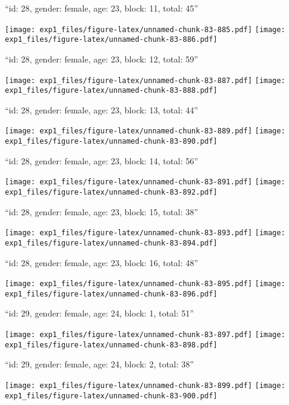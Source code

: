 \documentclass[11pt,,]{article}
\begin{document}
\newpage
[1] 

``id: 28, gender: female, age: 23, block: 11, total: 45''

\texttt{[image: exp1\_files/figure-latex/unnamed-chunk-83-885.pdf]}
\texttt{[image: exp1\_files/figure-latex/unnamed-chunk-83-886.pdf]}

\newpage
[1] 

``id: 28, gender: female, age: 23, block: 12, total: 59''

\texttt{[image: exp1\_files/figure-latex/unnamed-chunk-83-887.pdf]}
\texttt{[image: exp1\_files/figure-latex/unnamed-chunk-83-888.pdf]}

\newpage
[1] 

``id: 28, gender: female, age: 23, block: 13, total: 44''

\texttt{[image: exp1\_files/figure-latex/unnamed-chunk-83-889.pdf]}
\texttt{[image: exp1\_files/figure-latex/unnamed-chunk-83-890.pdf]}

\newpage
[1] 

``id: 28, gender: female, age: 23, block: 14, total: 56''

\texttt{[image: exp1\_files/figure-latex/unnamed-chunk-83-891.pdf]}
\texttt{[image: exp1\_files/figure-latex/unnamed-chunk-83-892.pdf]}

\newpage
[1] 

``id: 28, gender: female, age: 23, block: 15, total: 38''

\texttt{[image: exp1\_files/figure-latex/unnamed-chunk-83-893.pdf]}
\texttt{[image: exp1\_files/figure-latex/unnamed-chunk-83-894.pdf]}

\newpage
[1] 

``id: 28, gender: female, age: 23, block: 16, total: 48''

\texttt{[image: exp1\_files/figure-latex/unnamed-chunk-83-895.pdf]}
\texttt{[image: exp1\_files/figure-latex/unnamed-chunk-83-896.pdf]}

\newpage
[1] 

``id: 29, gender: female, age: 24, block: 1, total: 51''

\texttt{[image: exp1\_files/figure-latex/unnamed-chunk-83-897.pdf]}
\texttt{[image: exp1\_files/figure-latex/unnamed-chunk-83-898.pdf]}

\newpage
[1] 

``id: 29, gender: female, age: 24, block: 2, total: 38''

\texttt{[image: exp1\_files/figure-latex/unnamed-chunk-83-899.pdf]}
\texttt{[image: exp1\_files/figure-latex/unnamed-chunk-83-900.pdf]}
\end{document}
